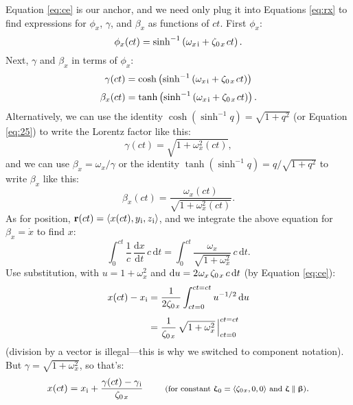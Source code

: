 \documentclass[12pt]{article}
\renewcommand{\vv}[1]{\mathbf{#1}}
\newcommand{\dd}[1]{\mathrm{d}#1}
\newcommand{\vvbeta}{\bm{\upbeta}}
\newcommand{\vvzeta}{\bm{\upzeta}}
\begin{document}
Equation \ref{eq:ce} is our anchor, and we need only plug it into Equations \ref{eq:rx} to find expressions for $\phi_x$, $\gamma$, and $\beta_x$ as functions of $ct$. First $\phi_x$:
\begin{equation*}
\phi_x (ct) = \sinh^{-1} \left( \omega_{x \mkern2mu \textrm{i}} + \zeta_{0 \mkern2mu x} \mkern2mu ct \right) .
\end{equation*}
Next, $\gamma$ and $\beta_x$ in terms of $\phi_x$:
\begin{equation*}
\gamma (ct) = \cosh \left( \sinh^{-1} \left( \omega_{x \mkern2mu \textrm{i}} + \zeta_{0 \mkern2mu x} \mkern2mu ct \right)  \right)
\end{equation*}
\begin{equation*}
\beta_x (ct) = \tanh \left( \sinh^{-1} \left( \omega_{x \mkern2mu \textrm{i}} + \zeta_{0 \mkern2mu x} \mkern2mu ct \right) \right).
\end{equation*}
Alternatively, we can use the identity $\cosh{(\sinh^{-1} q) = \sqrt{1 + q^2}}$ (or Equation \ref{eq:25}) to write the Lorentz factor like this:
\begin{equation*}
\gamma (ct) = \sqrt{1 + \omega^2_x (ct)} ,
\end{equation*}
and we can use $\beta_x = \omega_x / \gamma$ or the identity $\tanh{(\sinh^{-1} q)} = q / \sqrt{1 + q^2}$ to write $\beta_x$ like this:
\begin{equation*}
\beta_x (ct) = \dfrac{\omega_x (ct)}{\sqrt{1 + \omega^2_x (ct)}} .
\end{equation*}
As for position, $\vv r (ct) = \langle x (ct) , y_{\mkern1mu \mathrm{i}}, z_{\mkern1mu \mathrm{i}} \rangle$, and we integrate the above equation for $\beta_x = \dot{x}$ to find $x$:
\begin{equation*}
\int_0^{ct} \dfrac{1}{c} \, \dfrac{\dd x}{\dd t} \, c \, \dd t = \int_0^{ct} \dfrac{\omega_x}{\sqrt{1 + \omega^2_x}} \, c \, \dd t .
\end{equation*}
Use substitution, with $u = 1 + \omega^2_x$ and $\dd u = 2 \mkern1mu \omega_x \mkern2mu \zeta_{0 \mkern2mu x} \, c \, \dd t$ (by Equation \ref{eq:ce}):
\begin{equation*}
\begin{split}
x (ct) - x_{\mathrm{i}} &= \dfrac{1}{2 \zeta_{0 \mkern2mu x}} \int_{ct = 0}^{ct = ct} u^{-1/2} \, \dd u \\[5pt]
&= \dfrac{1}{ \zeta_{0 \mkern2mu x}} \, \sqrt{1 + \omega^2_x } \, \Big \vert^{ct = ct}_{ct = 0}
\end{split}
\end{equation*}
(division by a vector is illegal---this is why we switched to component notation). But $\gamma = \sqrt{1 + \omega^2_x}$, so that's:
\begin{equation}\label{eq:x}
x (ct) = x_{\mathrm{i}} + \dfrac{ \gamma (ct) - \gamma_{\mkern1mu \mathrm{i}} }{ \zeta_{0 \mkern2mu x}} \qquad \textrm{\footnotesize{ (for constant $\vvzeta_{\mkern1mu 0} = \langle \zeta_{0 \mkern1mu x} , 0, 0 \rangle$ and $\vvzeta \parallel \vvbeta$)}}.
\end{equation}
\end{document}
